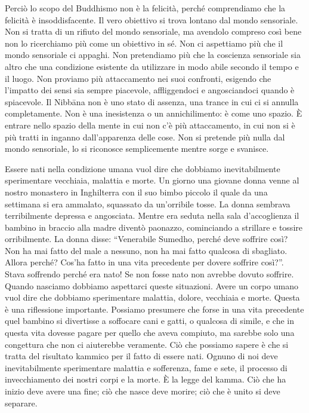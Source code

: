 Perciò lo scopo del Buddhismo non è la felicità, perché comprendiamo che
la felicità è insoddisfacente. Il vero obiettivo si trova lontano dal
mondo sensoriale. Non si tratta di un rifiuto del mondo sensoriale, ma
avendolo compreso così bene non lo ricerchiamo più come un obiettivo in
sé. Non ci aspettiamo più che il mondo sensoriale ci appaghi. Non
pretendiamo più che la coscienza sensoriale sia altro che una condizione
esistente da utilizzare in modo abile secondo il tempo e il luogo. Non
proviamo più attaccamento nei suoi confronti, esigendo che l'impatto dei
sensi sia sempre piacevole, affliggendoci e angosciandoci quando è
spiacevole. Il Nibbāna non è uno stato di assenza, una trance in cui ci
si annulla completamente. Non è una inesistenza o un annichilimento: è
come uno spazio. È entrare nello spazio della mente in cui non c'è più
attaccamento, in cui non si è più tratti in inganno dall'apparenza delle
cose. Non si pretende più nulla dal mondo sensoriale, lo si riconosce
semplicemente mentre sorge e svanisce.

Essere nati nella condizione umana vuol dire che dobbiamo
inevitabilmente sperimentare vecchiaia, malattia e morte. Un giorno una
giovane donna venne al nostro monastero in Inghilterra con il suo bimbo
piccolo il quale da una settimana si era ammalato, squassato da
un'orribile tosse. La donna sembrava terribilmente depressa e
angosciata. Mentre era seduta nella sala d'accoglienza il bambino in
braccio alla madre diventò paonazzo, cominciando a strillare e tossire
orribilmente. La donna disse: ``Venerabile Sumedho, perché deve soffrire
così? Non ha mai fatto del male a nessuno, non ha mai fatto qualcosa di
sbagliato. Allora perché? Cos'ha fatto in una vita precedente per dovere
soffrire così?''. Stava soffrendo perché era nato! Se non fosse nato non
avrebbe dovuto soffrire. Quando nasciamo dobbiamo aspettarci queste
situazioni. Avere un corpo umano vuol dire che dobbiamo sperimentare
malattia, dolore, vecchiaia e morte. Questa è una riflessione
importante. Possiamo presumere che forse in una vita precedente quel
bambino si divertisse a soffocare cani e gatti, o qualcosa di simile, e
che in questa vita dovesse pagare per quello che aveva compiuto, ma
sarebbe solo una congettura che non ci aiuterebbe veramente. Ciò che
possiamo sapere è che si tratta del risultato kammico per il fatto di
essere nati. Ognuno di noi deve inevitabilmente sperimentare malattia e
sofferenza, fame e sete, il processo di invecchiamento dei nostri corpi
e la morte. È la legge del kamma. Ciò che ha inizio deve avere una fine;
ciò che nasce deve morire; ciò che è unito si deve separare.

